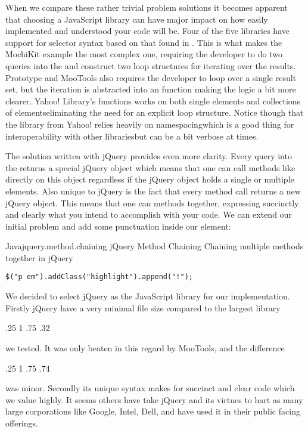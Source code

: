 When we compare these rather trivial problem solutions it becomes apparent
that choosing a JavaScript library can have major impact on how easily
implemented and understood your code will be. Four of the five libraries
have support for selector syntax based on
that found in .%
This is what makes the MochiKit example the most complex one, requiring the
developer to do two queries into the  and construct two
loop structures for iterating over the results.
Prototype and MooTools also requires the developer to loop over a single
result set, but the iteration is abstracted into an  function
making the logic a bit more clearer. Yahoo!  Library's 
functions works on both single elements and collections of
elements\dash{}eliminating the need for an explicit loop structure.
Notice though that the library from
Yahoo! relies heavily on namespacing\dash{}which is a good thing for
interoperability with other libraries\dash{}but can be a bit verbose at times.

The solution written with jQuery provides even more clarity.
Every query into the  returns a special jQuery object which means
that one can call methods like  directly on this object
regardless if the jQuery object holds a single or multiple elements.
Also unique to jQuery is the fact that every method call returns a new jQuery
object. This means that one can  methods together, expressing
succinctly and clearly what you intend to accomplish with your code. We can
extend our initial problem and add some punctuation inside our 
element:

\begin{scode}{Java}{jquery.method.chaining}{%
  jQuery Method Chaining}{%
  Chaining multiple methods together in jQuery}
\begin{lstlisting}
$("p em").addClass("highlight").append("!");
\end{lstlisting}
\end{scode}

We decided to select jQuery as the JavaScript library for our implementation.
Firstly jQuery have a very minimal file size compared to the largest library
\begin{sparkline}{3}
  \sparkspike .25  1
  \sparkspike .75  .32
\end{sparkline}
we tested. It was only beaten in this regard by MooTools, and the difference
\begin{sparkline}{3}
  \sparkspike .25  1
  \sparkspike .75  .74
\end{sparkline}
was minor. Secondly its unique syntax makes for succinct and clear code
which we value highly.
It seems others have take jQuery and its
virtues to hart as many large corporations like Google, Intel, Dell, and
 have used it in their public facing offerings.%

